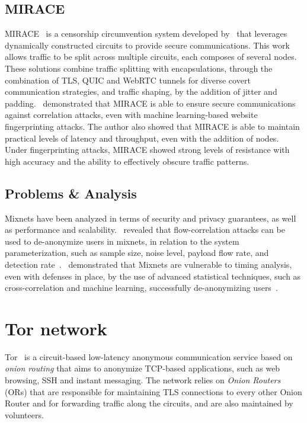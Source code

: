 \subsection{MIRACE}\label{subsec:mirace}
MIRACE~\cite{MIRACE} is a censorship circumvention system developed by~\citeauthor{MIRACE} that leverages dynamically constructed circuits to provide secure communications. This work allows traffic to be split across multiple circuits, each composes of several nodes. These solutions combine traffic splitting with encapsulations, through the combination of TLS, QUIC and WebRTC tunnels for diverse covert communication strategies, and traffic shaping, by the addition of jitter and padding.~\citeauthor{MIRACE} demonstrated that MIRACE is able to ensure secure communications against correlation attacks, even with machine learning-based website fingerprinting attacks. The author also showed that MIRACE is able to maintain practical levels of latency and throughput, even with the addition of nodes. Under fingerprinting attacks, MIRACE showed strong levels of resistance with high accuracy and the ability to effectively obscure traffic patterns. 
 
\subsection{Problems \& Analysis}\label{sec:problems_analysis}
Mixnets have been analyzed in terms of security and privacy guarantees, as well as performance and scalability.~\citeauthor{AnalysisMixNetsYeZhu} revealed that flow-correlation attacks can be used to de-anonymize users in mixnets, in relation to the system parameterization, such as sample size, noise  level, payload flow rate, and detection rate~\cite{AnalysisMixNetsYeZhu}.~\citeauthor{TrafficAnalysisLowMixnet} demonstrated that Mixnets are vulnerable to timing analysis, even with defenses in place, by the use of advanced statistical techniques, such as cross-correlation and machine learning, successfully de-anonymizing users~\cite{TrafficAnalysisLowMixnet}.

\section{Tor network}\label{sec:tor_network}
Tor~\cite{dingledine2004tor} is a circuit-based low-latency anonymous communication service based on \textit{onion routing} that aims to anonymize TCP-based applications, such as web browsing, SSH and instant messaging. The network relies on \textit{Onion Routers} (ORs) that are responsible for maintaining TLS connections to every other Onion Router and for forwarding traffic along the circuits, and are also maintained by volunteers.

